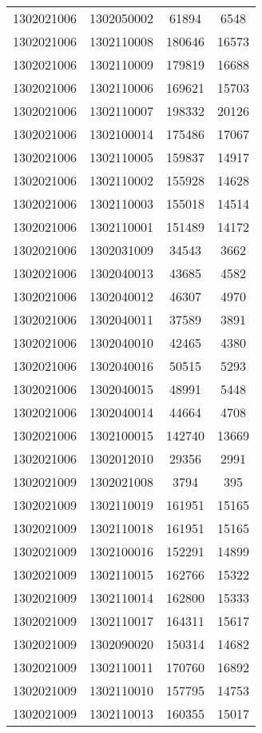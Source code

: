 \begin{longtable}[h]{llcc}
		1302021006 & 1302050002 & 61894 & 6548\\
		1302021006 & 1302110008 & 180646 & 16573\\
		1302021006 & 1302110009 & 179819 & 16688\\
		1302021006 & 1302110006 & 169621 & 15703\\
		1302021006 & 1302110007 & 198332 & 20126\\
		1302021006 & 1302100014 & 175486 & 17067\\
		1302021006 & 1302110005 & 159837 & 14917\\
		1302021006 & 1302110002 & 155928 & 14628\\
		1302021006 & 1302110003 & 155018 & 14514\\
		1302021006 & 1302110001 & 151489 & 14172\\
		1302021006 & 1302031009 & 34543 & 3662\\
		1302021006 & 1302040013 & 43685 & 4582\\
		1302021006 & 1302040012 & 46307 & 4970\\
		1302021006 & 1302040011 & 37589 & 3891\\
		1302021006 & 1302040010 & 42465 & 4380\\
		1302021006 & 1302040016 & 50515 & 5293\\
		1302021006 & 1302040015 & 48991 & 5448\\
		1302021006 & 1302040014 & 44664 & 4708\\
		1302021006 & 1302100015 & 142740 & 13669\\
		1302021006 & 1302012010 & 29356 & 2991\\
		1302021009 & 1302021008 & 3794 & 395\\
		1302021009 & 1302110019 & 161951 & 15165\\
		1302021009 & 1302110018 & 161951 & 15165\\
		1302021009 & 1302100016 & 152291 & 14899\\
		1302021009 & 1302110015 & 162766 & 15322\\
		1302021009 & 1302110014 & 162800 & 15333\\
		1302021009 & 1302110017 & 164311 & 15617\\
		1302021009 & 1302090020 & 150314 & 14682\\
		1302021009 & 1302110011 & 170760 & 16892\\
		1302021009 & 1302110010 & 157795 & 14753\\
		1302021009 & 1302110013 & 160355 & 15017\\

\end{longtable}
